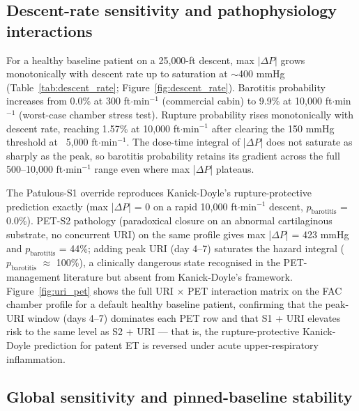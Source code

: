 \documentclass[11pt,a4paper]{article}
\begin{document}
\subsection{Descent-rate sensitivity and pathophysiology interactions}

For a healthy baseline patient on a 25,000-ft descent, max $|\Delta P|$ grows monotonically with descent rate up to saturation at $\sim$400 mmHg (Table~\ref{tab:descent_rate}; Figure~\ref{fig:descent_rate}). Barotitis probability increases from 0.0\% at 300 ft$\cdot$min$^{-1}$ (commercial cabin) to 9.9\% at 10,000 ft$\cdot$min$^{-1}$ (worst-case chamber stress test). Rupture probability rises monotonically with descent rate, reaching 1.57\% at 10,000 ft$\cdot$min$^{-1}$ after clearing the 150 mmHg threshold at ~5,000 ft$\cdot$min$^{-1}$. The dose-time integral of |$\Delta P$| does not saturate as sharply as the peak, so barotitis probability retains its gradient across the full 500--10,000 ft$\cdot$min$^{-1}$ range even where max |$\Delta P$| plateaus.

The Patulous-S1 override reproduces Kanick-Doyle's rupture-protective prediction exactly (max |$\Delta P$| = 0 on a rapid 10,000 ft$\cdot$min$^{-1}$ descent, $p_{\mathrm{barotitis}}$ = 0.0\%). PET-S2 pathology (paradoxical closure on an abnormal cartilaginous substrate, no concurrent URI) on the same profile gives max |$\Delta P$| = 423 mmHg and $p_{\mathrm{barotitis}}$ = 44\%; adding peak URI (day 4--7) saturates the hazard integral ($p_{\mathrm{barotitis}}$ $\approx$ 100\%), a clinically dangerous state recognised in the PET-management literature \citep{Kobayashi2018,Kikuchi2017,Shindo2025} but absent from Kanick-Doyle's framework. Figure~\ref{fig:uri_pet} shows the full URI $\times$ PET interaction matrix on the FAC chamber profile for a default healthy baseline patient, confirming that the peak-URI window (days 4--7) dominates each PET row and that S1 + URI elevates risk to the same level as S2 + URI --- that is, the rupture-protective Kanick-Doyle prediction for patent ET is reversed under acute upper-respiratory inflammation.

\subsection{Global sensitivity and pinned-baseline stability}
\end{document}
